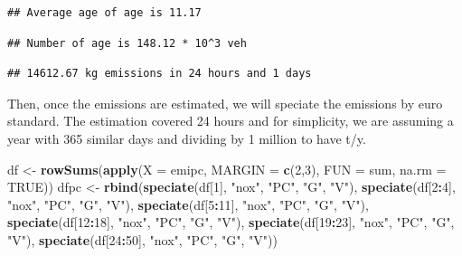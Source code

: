 \documentclass[12pt,graybox,envcountchap,sectrefs]{krantz}
\makeatletter
\newenvironment{Shaded}{\begin{snugshade}}{\end{snugshade}}
\newcommand{\KeywordTok}[1]{\textcolor[rgb]{0.13,0.29,0.53}{\textbf{#1}}}
\newcommand{\DataTypeTok}[1]{\textcolor[rgb]{0.13,0.29,0.53}{#1}}
\newcommand{\DecValTok}[1]{\textcolor[rgb]{0.00,0.00,0.81}{#1}}
\newcommand{\StringTok}[1]{\textcolor[rgb]{0.31,0.60,0.02}{#1}}
\newcommand{\OtherTok}[1]{\textcolor[rgb]{0.56,0.35,0.01}{#1}}
\newcommand{\OperatorTok}[1]{\textcolor[rgb]{0.81,0.36,0.00}{\textbf{#1}}}
\newcommand{\NormalTok}[1]{#1}
\newenvironment{kframe}{%
\medskip{}
\setlength{\fboxsep}{.8em}
 \def\at@end@of@kframe{}%
 \ifinner\ifhmode%
  \def\at@end@of@kframe{\end{minipage}}%
  \begin{minipage}{\columnwidth}%
 \fi\fi%
 \def\FrameCommand##1{\hskip\@totalleftmargin \hskip-\fboxsep
 \colorbox{shadecolor}{##1}\hskip-\fboxsep
     \hskip-\linewidth \hskip-\@totalleftmargin \hskip\columnwidth}%
 \MakeFramed {\advance\hsize-\width
   \@totalleftmargin\z@ \linewidth\hsize
   \@setminipage}}%
 {\par\unskip\endMakeFramed%
 \at@end@of@kframe}
\renewenvironment{Shaded}{\begin{kframe}}{\end{kframe}}
\theoremstyle{definition}
\theoremstyle{definition}
\theoremstyle{definition}
\theoremstyle{remark}
\makeatother
\begin{document}
\begin{verbatim}
## Average age of age is 11.17
\end{verbatim}

\begin{verbatim}
## Number of age is 148.12 * 10^3 veh
\end{verbatim}

\begin{verbatim}
## 14612.67 kg emissions in 24 hours and 1 days
\end{verbatim}

Then, once the emissions are estimated, we will speciate the emissions
by euro standard. The estimation covered 24 hours and for simplicity, we
are assuming a year with 365 similar days and dividing by 1 million to
have t/y.

\begin{Shaded}
\begin{Highlighting}[]
\NormalTok{df <-}\StringTok{ }\KeywordTok{rowSums}\NormalTok{(}\KeywordTok{apply}\NormalTok{(}\DataTypeTok{X =}\NormalTok{ emipc, }\DataTypeTok{MARGIN =} \KeywordTok{c}\NormalTok{(}\DecValTok{2}\NormalTok{,}\DecValTok{3}\NormalTok{), }\DataTypeTok{FUN =}\NormalTok{ sum, }\DataTypeTok{na.rm =} \OtherTok{TRUE}\NormalTok{))}
\NormalTok{dfpc <-}\StringTok{   }\KeywordTok{rbind}\NormalTok{(}\KeywordTok{speciate}\NormalTok{(df[}\DecValTok{1}\NormalTok{], }\StringTok{"nox"}\NormalTok{, }\StringTok{"PC"}\NormalTok{, }\StringTok{"G"}\NormalTok{, }\StringTok{"V"}\NormalTok{),}
                \KeywordTok{speciate}\NormalTok{(df[}\DecValTok{2}\OperatorTok{:}\DecValTok{4}\NormalTok{], }\StringTok{"nox"}\NormalTok{, }\StringTok{"PC"}\NormalTok{, }\StringTok{"G"}\NormalTok{, }\StringTok{"V"}\NormalTok{),}
                \KeywordTok{speciate}\NormalTok{(df[}\DecValTok{5}\OperatorTok{:}\DecValTok{11}\NormalTok{], }\StringTok{"nox"}\NormalTok{, }\StringTok{"PC"}\NormalTok{, }\StringTok{"G"}\NormalTok{, }\StringTok{"V"}\NormalTok{),}
                \KeywordTok{speciate}\NormalTok{(df[}\DecValTok{12}\OperatorTok{:}\DecValTok{18}\NormalTok{], }\StringTok{"nox"}\NormalTok{, }\StringTok{"PC"}\NormalTok{, }\StringTok{"G"}\NormalTok{, }\StringTok{"V"}\NormalTok{),}
                \KeywordTok{speciate}\NormalTok{(df[}\DecValTok{19}\OperatorTok{:}\DecValTok{23}\NormalTok{], }\StringTok{"nox"}\NormalTok{, }\StringTok{"PC"}\NormalTok{, }\StringTok{"G"}\NormalTok{, }\StringTok{"V"}\NormalTok{),}
                \KeywordTok{speciate}\NormalTok{(df[}\DecValTok{24}\OperatorTok{:}\DecValTok{50}\NormalTok{], }\StringTok{"nox"}\NormalTok{, }\StringTok{"PC"}\NormalTok{, }\StringTok{"G"}\NormalTok{, }\StringTok{"V"}\NormalTok{))}

\end{Highlighting}
\end{Shaded}
\end{document}
